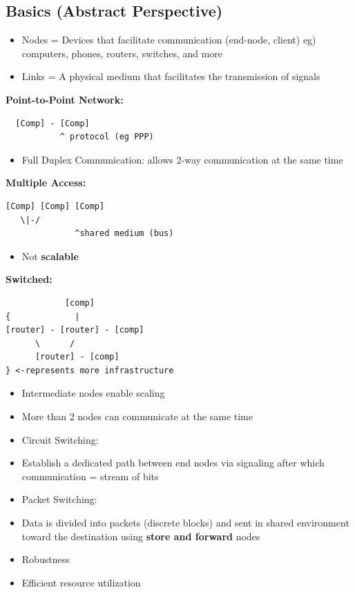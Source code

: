 \documentclass[11pt]{article}
\begin{document}
\subsection{Basics (Abstract Perspective)}
\label{sec:orgheadline4}
\begin{itemize}
\item Nodes = Devices that facilitate communication (end-node, client)
eg) computers, phones, routers, switches, and more
\item Links = A physical medium that facilitates the transmission of
signals
\end{itemize}



\textbf{Point-to-Point Network:}

\begin{verbatim}
  [Comp] - [Comp] 
           ^ protocol (eg PPP)
\end{verbatim}

\begin{itemize}
\item Full Duplex Communication: allows 2-way communication at the same
time
\end{itemize}



\textbf{Multiple Access:}

\begin{verbatim}
[Comp] [Comp] [Comp]
   \|-/ 
              ^shared medium (bus)
\end{verbatim}

\begin{itemize}
\item Not \textbf{scalable}
\end{itemize}



\textbf{Switched:}

\begin{verbatim}
            [comp]
{             |
[router] - [router] - [comp]  
      \      /
      [router] - [comp]
} <-represents more infrastructure
\end{verbatim}

\begin{itemize}
\item Intermediate nodes enable scaling
\item More than 2 nodes can communicate at the same time

\item Circuit Switching:
\item Establish a dedicated path between end nodes via signaling after which communication = stream of bits
\item Packet Switching:
\item Data is divided into packets (discrete blocks) and sent in shared environment toward the destination using \textbf{store and forward} nodes
\item Robustness
\item Efficient resource utilization
\end{itemize}
\end{document}
